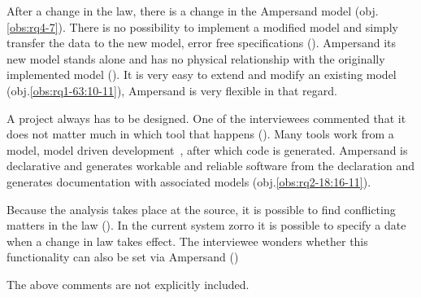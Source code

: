 After a change in the law, there is a change in the Ampersand model (obj.\ref{obs:rq4-7}).
There is no possibility to implement a modified model and simply transfer the data to the new model, error free specifications ().
Ampersand its new model stands alone and has no physical relationship with the originally implemented model ().
It is very easy to extend and modify an existing model (obj.\ref{obs:rq1-63:10-11}), Ampersand is very flexible in that regard.
\label{s:1_10_ampersand_design_method}

A project always has to be designed.
One of the interviewees commented that it does not matter much in which tool that happens ().
Many tools work from a model, model driven development~\citep{kulkarni_abstraction_2008}, after which code is generated.
Ampersand is declarative and generates workable and reliable software from the declaration and generates documentation with associated models (obj.\ref{obs:rq2-18:16-11}).
\label{s:1_11_law_effective}

Because the analysis takes place at the source, it is possible to find conflicting matters in the law ().
In the current system \acrshort{zorro} it is possible to specify a date when a change in law takes effect.
The interviewee wonders whether this functionality can also be set via Ampersand ()
\label{s:1_12_exclude_1}

The above comments are not explicitly included.